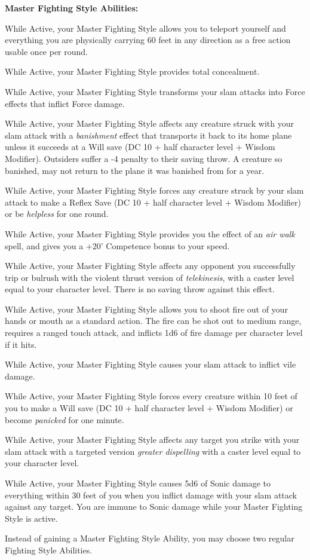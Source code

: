 \textbf{Master Fighting Style Abilities:}
\begin{itemize*}
\item While Active, your Master Fighting Style allows you to teleport yourself and everything you are physically carrying 60 feet in any direction as a free action usable once per round.
\item While Active, your Master Fighting Style provides total concealment. 
\item While Active, your Master Fighting Style transforms your slam attacks into Force effects that inflict Force damage.
\item While Active, your Master Fighting Style affects any creature struck with your slam attack with a \textit{banishment} effect that transports it back to its home plane unless it succeeds at a Will save (DC 10 + half character level + Wisdom Modifier). Outsiders suffer a -4 penalty to their saving throw. A creature so banished, may not return to the plane it was banished from for a year.
\item While Active, your Master Fighting Style forces any creature struck by your slam attack to make a Reflex Save (DC 10 + half character level + Wisdom Modifier) or be \textit{helpless} for one round.
\item While Active, your Master Fighting Style provides you the effect of an \textit{air walk} spell, and gives you a +20' Competence bonus to your speed.
\item While Active, your Master Fighting Style affects any opponent you successfully trip or bulrush with the violent thrust version of \textit{telekinesis}, with a caster level equal to your character level. There is no saving throw against this effect.
\item While Active, your Master Fighting Style allows you to shoot fire out of your hands or mouth as a standard action. The fire can be shot out to medium range, requires a ranged touch attack, and inflicts 1d6 of fire damage per character level if it hits.
\item While Active, your Master Fighting Style causes your slam attack to inflict vile damage.
\item While Active, your Master Fighting Style forces every creature within 10 feet of you to make a Will save (DC 10 + half character level + Wisdom Modifier) or become \textit{panicked} for one minute.
\item While Active, your Master Fighting Style affects any target you strike with your slam attack with a targeted version \textit{greater dispelling} with a caster level equal to your character level. 
\item While Active, your Master Fighting Style causes 5d6 of Sonic damage to everything within 30 feet of you when you inflict damage with your slam attack against any target. You are immune to Sonic damage while your Master Fighting Style is active.
\item Instead of gaining a Master Fighting Style Ability, you may choose two regular Fighting Style Abilities.
\end{itemize*}

